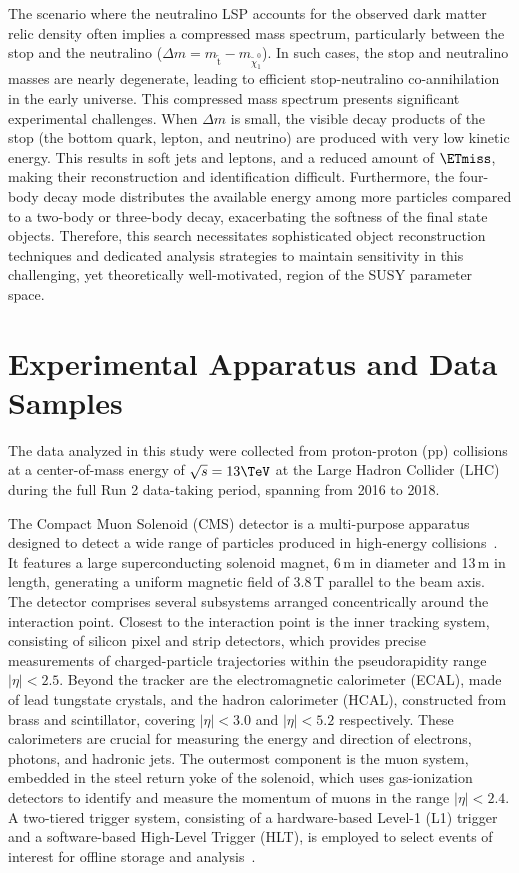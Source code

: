 The scenario where the neutralino LSP accounts for the observed dark matter relic density often implies a compressed mass spectrum, particularly between the stop and the neutralino ($\Delta m = m_{\tilde{\mathrm{t}}} - m_{\tilde{\chi}_1^0}$). In such cases, the stop and neutralino masses are nearly degenerate, leading to efficient stop-neutralino co-annihilation in the early universe. This compressed mass spectrum presents significant experimental challenges. When $\Delta m$ is small, the visible decay products of the stop (the bottom quark, lepton, and neutrino) are produced with very low kinetic energy. This results in soft jets and leptons, and a reduced amount of $\ETmiss$, making their reconstruction and identification difficult. Furthermore, the four-body decay mode distributes the available energy among more particles compared to a two-body or three-body decay, exacerbating the softness of the final state objects. Therefore, this search necessitates sophisticated object reconstruction techniques and dedicated analysis strategies to maintain sensitivity in this challenging, yet theoretically well-motivated, region of the SUSY parameter space.

\section{Experimental Apparatus and Data Samples}

The data analyzed in this study were collected from proton-proton (pp) collisions at a center-of-mass energy of $\sqrt{s} = 13\TeV$ at the Large Hadron Collider (LHC) during the full Run 2 data-taking period, spanning from 2016 to 2018.

The Compact Muon Solenoid (CMS) detector is a multi-purpose apparatus designed to detect a wide range of particles produced in high-energy collisions~\cite{CMS-TDR-001}. It features a large superconducting solenoid magnet, 6\,m in diameter and 13\,m in length, generating a uniform magnetic field of 3.8\,T parallel to the beam axis. The detector comprises several subsystems arranged concentrically around the interaction point. Closest to the interaction point is the inner tracking system, consisting of silicon pixel and strip detectors, which provides precise measurements of charged-particle trajectories within the pseudorapidity range $|\eta| < 2.5$. Beyond the tracker are the electromagnetic calorimeter (ECAL), made of lead tungstate crystals, and the hadron calorimeter (HCAL), constructed from brass and scintillator, covering $|\eta| < 3.0$ and $|\eta| < 5.2$ respectively. These calorimeters are crucial for measuring the energy and direction of electrons, photons, and hadronic jets. The outermost component is the muon system, embedded in the steel return yoke of the solenoid, which uses gas-ionization detectors to identify and measure the momentum of muons in the range $|\eta| < 2.4$. A two-tiered trigger system, consisting of a hardware-based Level-1 (L1) trigger and a software-based High-Level Trigger (HLT), is employed to select events of interest for offline storage and analysis~\cite{CMS-TDR-001}.

